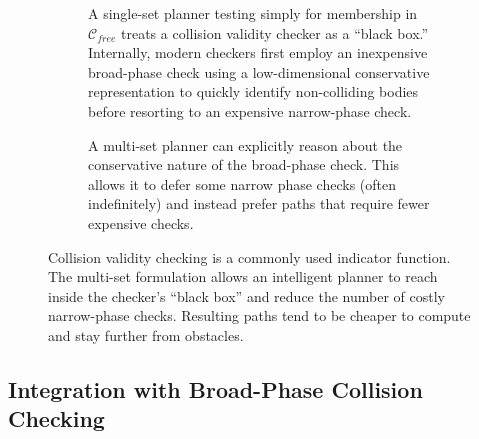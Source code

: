 \documentclass{report}
\begin{document}
\begin{figure}
\centering

\begin{subfigure}[t]{\linewidth}
\centering

\caption{A single-set planner testing simply for membership in
  $\mathcal{C}_{free}$ treats a collision validity checker as a
  ``black box.''
  Internally,
  modern checkers first employ an inexpensive broad-phase check
  using a low-dimensional conservative representation
  to quickly identify non-colliding bodies before
  resorting to an expensive narrow-phase check.}
\end{subfigure}

\vspace{0.2in}

\begin{subfigure}[t]{\linewidth}
\centering

\caption{A multi-set planner can explicitly reason about the
  conservative nature of the broad-phase check.
  This allows it to defer some narrow phase checks
  (often indefinitely)
  and instead prefer paths that require fewer expensive checks.}
\end{subfigure}

\caption{Collision validity checking is a commonly used
  indicator function.
  The multi-set formulation allows an intelligent planner to
  reach inside the checker's ``black box'' and reduce the number
  of costly narrow-phase checks.
  Resulting paths tend to be cheaper to compute and
  stay further from obstacles.}
\label{fig:broad-phase}
\end{figure}

\subsection{Integration with Broad-Phase Collision Checking}
\label{subsec:broad-phase}
\end{document}
